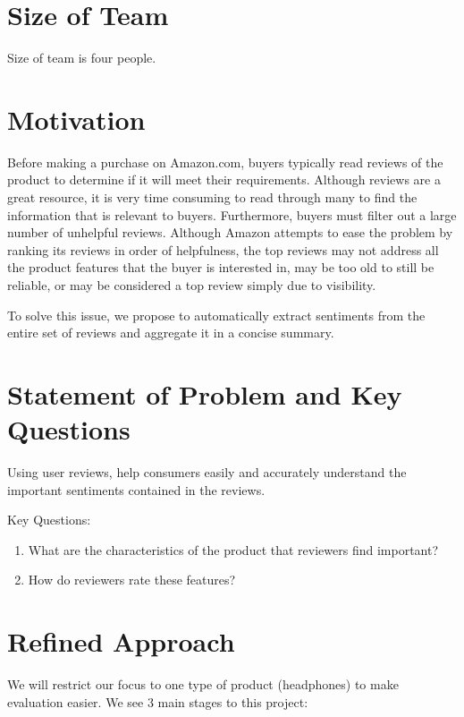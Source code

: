 \documentclass{article}
\begin{document}
 


\section{Size of Team}
Size of team is four people. 

\section{Motivation} 
 
Before making a purchase on Amazon.com, buyers typically read reviews of the product to determine if it will meet their requirements. Although reviews are a great resource, it is very time consuming to read through many to find the information that is relevant to buyers. Furthermore, buyers must filter out a large number of unhelpful reviews. Although Amazon attempts to ease the problem by ranking its reviews in order of helpfulness, the top reviews may not address all the product features that the buyer is interested in, may be too old to still be reliable, or may be considered a top review simply due to visibility. 

To solve this issue, we propose to automatically extract sentiments from the entire set of reviews and aggregate it in a concise summary.

\section{Statement of Problem and Key Questions} 

Using user reviews, help consumers easily and accurately understand the important sentiments contained in the reviews. 

Key Questions:

\begin{enumerate}
\item What are the characteristics of the product that reviewers find important?
\item How do reviewers rate these features?
\end{enumerate}

\section{Refined Approach}
We will restrict our focus to one type of product (headphones) to make evaluation easier. We see 3 main stages to this project:
\end{document}
